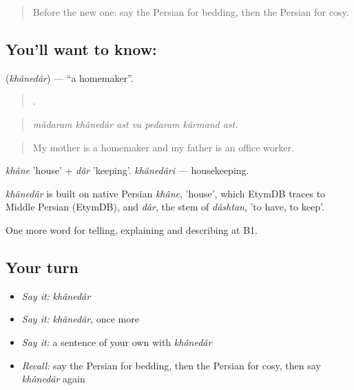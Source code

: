 \label{lesson:FA-C535-khanedar}



\begin{quote}
Before the new one: say the Persian for bedding, then the Persian for cosy.
\end{quote}

\subsection*{You'll want to know:  }
\textbf{ } (\emph{khânedâr}) — \textquotedblleft{}a homemaker\textquotedblright{}.

\begin{quote}
       .
\end{quote}

\begin{quote}
\emph{mâdaram khânedâr ast va pedaram kârmand ast.}
\end{quote}

\begin{quote}
My mother is a homemaker and my father is an office worker.
\end{quote}

\emph{khâne} 'house' + \emph{dâr} 'keeping'. \emph{khânedâri} — housekeeping.

\begin{cousinweb}
\emph{khânedâr} is built on native Persian \emph{khâne}, 'house', which EtymDB traces to Middle Persian (EtymDB), and \emph{dâr}, the stem of \emph{dâshtan}, 'to have, to keep'.
\end{cousinweb}

\begin{grammarlens}[title={What you've built}]
One more word for telling, explaining and describing at B1.
\end{grammarlens}

\subsection*{Your turn}
\begin{itemize}
\raggedright
  \item \emph{Say it:} \emph{khânedâr}
  \item \emph{Say it:} \emph{khânedâr}, once more
  \item \emph{Say it:} a sentence of your own with \emph{khânedâr}
  \item \emph{Recall:} say the Persian for bedding, then the Persian for cosy, then say \emph{khânedâr} again
\end{itemize}


